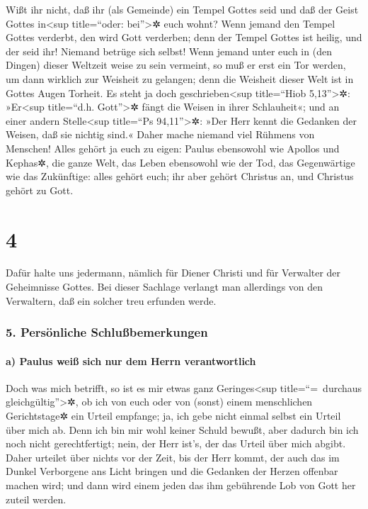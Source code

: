  Wißt ihr nicht, daß ihr (als Gemeinde) ein Tempel Gottes
seid und daß der Geist Gottes in\textless sup title=``oder:
bei''\textgreater✲ euch wohnt?  Wenn jemand den Tempel
Gottes verderbt, den wird Gott verderben; denn der Tempel Gottes ist
heilig, und der seid ihr!  Niemand betrüge sich selbst!
Wenn jemand unter euch in (den Dingen) dieser Weltzeit weise zu sein
vermeint, so muß er erst ein Tor werden, um dann wirklich zur Weisheit
zu gelangen;  denn die Weisheit dieser Welt ist in Gottes
Augen Torheit. Es steht ja doch geschrieben\textless sup title=``Hiob
5,13''\textgreater✲: »Er\textless sup title=``d.h. Gott''\textgreater✲
fängt die Weisen in ihrer Schlauheit«;  und an einer
andern Stelle\textless sup title=``Ps 94,11''\textgreater✲: »Der Herr
kennt die Gedanken der Weisen, daß sie nichtig sind.« 
Daher mache niemand viel Rühmens von Menschen! Alles gehört ja euch zu
eigen:  Paulus ebensowohl wie Apollos und Kephas✲, die
ganze Welt, das Leben ebensowohl wie der Tod, das Gegenwärtige wie das
Zukünftige: alles gehört euch;  ihr aber gehört Christus
an, und Christus gehört zu Gott.

\hypertarget{section-3}{%
\section{4}\label{section-3}}

 Dafür halte uns jedermann, nämlich für Diener Christi und
für Verwalter der Geheimnisse Gottes.  Bei dieser Sachlage
verlangt man allerdings von den Verwaltern, daß ein solcher treu
erfunden werde.

\hypertarget{persuxf6nliche-schluuxdfbemerkungen}{%
\subsubsection{5. Persönliche
Schlußbemerkungen}\label{persuxf6nliche-schluuxdfbemerkungen}}

\hypertarget{a-paulus-weiuxdf-sich-nur-dem-herrn-verantwortlich}{%
\paragraph{a) Paulus weiß sich nur dem Herrn
verantwortlich}\label{a-paulus-weiuxdf-sich-nur-dem-herrn-verantwortlich}}

 Doch was mich betrifft, so ist es mir etwas ganz
Geringes\textless sup title=``=~durchaus gleichgültig''\textgreater✲, ob
ich von euch oder von (sonst) einem menschlichen Gerichtstage✲ ein
Urteil empfange; ja, ich gebe nicht einmal selbst ein Urteil über mich
ab.  Denn ich bin mir wohl keiner Schuld bewußt, aber
dadurch bin ich noch nicht gerechtfertigt; nein, der Herr ist's, der das
Urteil über mich abgibt.  Daher urteilet über nichts vor
der Zeit, bis der Herr kommt, der auch das im Dunkel Verborgene ans
Licht bringen und die Gedanken der Herzen offenbar machen wird; und dann
wird einem jeden das ihm gebührende Lob von Gott her zuteil werden.

